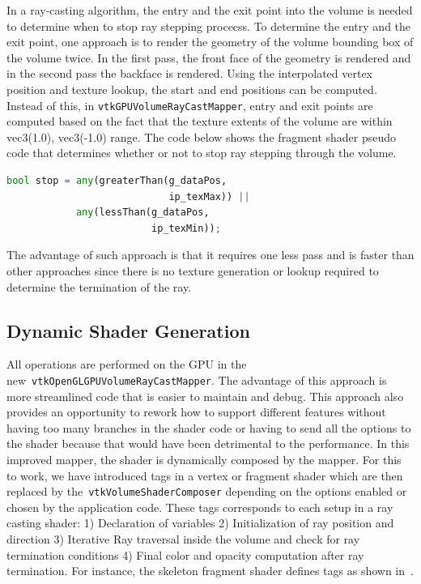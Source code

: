 
In a ray-casting algorithm, the entry and the exit point into the volume is
needed to determine when to stop ray stepping procecss. To determine the entry and
the exit point, one approach is to render the geometry of the volume bounding
box of the volume twice. In the first pass, the front face of the geometry is
rendered and in the second pass the backface is rendered.
Using the interpolated vertex position and
texture lookup, the start and end positions can be computed. Instead of this, in
\texttt{vtkGPUVolumeRayCastMapper}, entry and exit points are computed based on
the fact that the texture extents of the volume are within vec3(1.0), vec3(-1.0)
range.%
The code below shows the
fragment shader pseudo code that determines whether or not to stop ray stepping
through the volume.

\begin{center}
  \begin{lstlisting}[language=Python, caption={Ray stop determination},
                     captionpos=b, frame=single, breaklines=true]
bool stop = any(greaterThan(g_dataPos,
                            ip_texMax)) ||
            any(lessThan(g_dataPos,
                         ip_texMin));
  \end{lstlisting}
\end{center}

The advantage of such approach is that it requires one less pass and is faster
than other approaches since there is no texture generation or lookup required
to determine the termination of the ray.


\subsection{Dynamic Shader Generation}
All operations are performed on the GPU in the
new~\texttt{vtkOpenGLGPUVolumeRayCastMapper}. The advantage of this approach is
more streamlined code that is easier to maintain and debug. This approach also
provides an opportunity to rework how to support different features without
having too many branches in the shader code or having to send all the options to
the shader because that would have been detrimental to the performance. In this
improved mapper, the shader is dynamically composed by the mapper. For this to
work, we have introduced tags in a vertex or fragment shader which are then
replaced by the~\texttt{vtkVolumeShaderComposer} depending on the options
enabled or chosen by the application code. These tags corresponds to each setup
in a ray casting shader: 1) Declaration of variables 2) Initialization of ray
position and direction 3) Iterative Ray traversal inside the volume and check
for ray termination conditions 4) Final color and opacity computation after ray
termination. For instance, the skeleton fragment shader defines tags as shown
in~.

